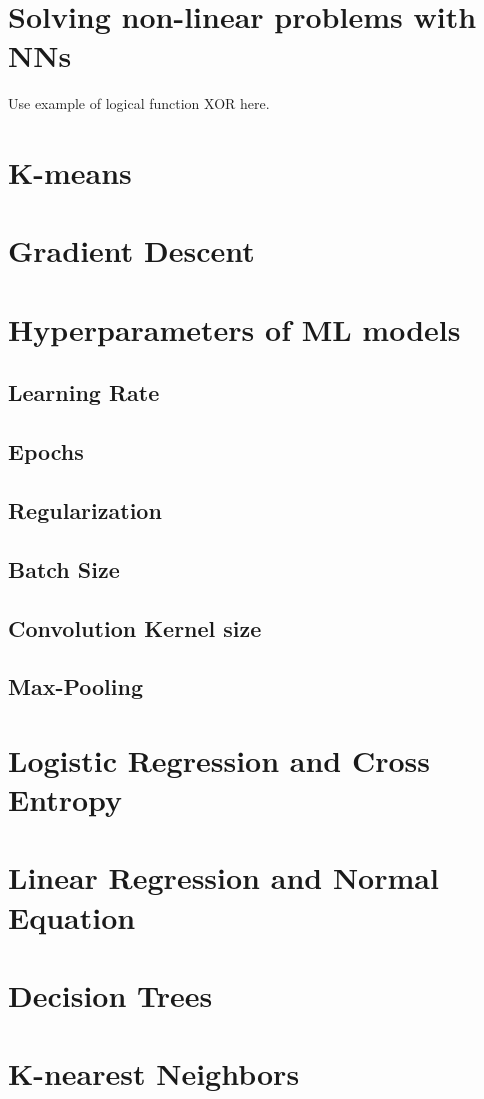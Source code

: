 \section{Solving non-linear problems with NNs}

\label{sec:solving_non_linear_problems_with_nns}

Use example of logical function XOR here.

\section{K-means}

\section{Gradient Descent}

\section{Hyperparameters of ML models}

\subsection{Learning Rate}
\subsection{Epochs}
\subsection{Regularization}
\subsection{Batch Size}
\subsection{Convolution Kernel size}
\subsection{Max-Pooling}

\section{Logistic Regression and Cross Entropy}


\section{Linear Regression and Normal Equation}


\section{Decision Trees}


\section{K-nearest Neighbors}

